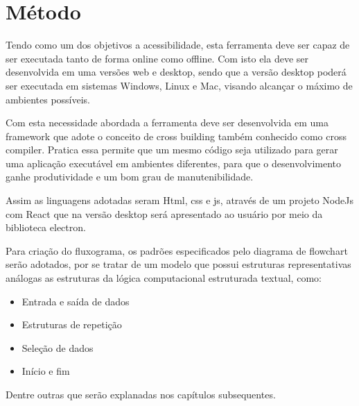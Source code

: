 \section{Método}
\par Tendo como um dos objetivos a acessibilidade, esta ferramenta deve ser capaz de ser executada tanto de forma online como offline. 
Com isto ela deve ser desenvolvida em uma versões web e desktop, sendo que a versão desktop poderá ser executada em sistemas Windows, Linux e Mac, visando alcançar o máximo de ambientes possíveis.
\par Com esta necessidade abordada a ferramenta deve ser desenvolvida em uma framework que adote o conceito de cross building também conhecido como cross compiler.
Pratica essa permite que um mesmo código seja utilizado para gerar uma aplicação executável em ambientes diferentes, para que o desenvolvimento ganhe produtividade e um bom grau de manutenibilidade. 
\par Assim as linguagens adotadas seram Html, css e js, através de um projeto NodeJs com React que na versão desktop será apresentado ao usuário por meio da biblioteca electron.
\par Para criação do fluxograma, os padrões especificados pelo diagrama de flowchart serão adotados, por se tratar de um modelo que possui estruturas representativas análogas as estruturas da lógica computacional estruturada textual, como:
\begin{itemize}
\item Entrada e saída de dados
\item Estruturas de repetição
\item Seleção de dados
\item Início e fim
\end{itemize}
\par Dentre outras que serão explanadas nos capítulos subsequentes.



